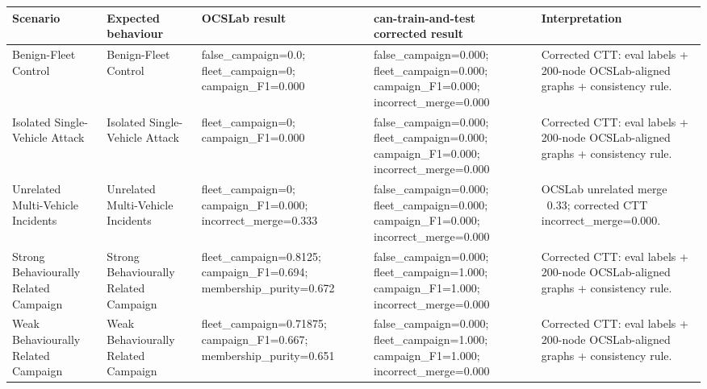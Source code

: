 \begin{tabular}{lllll}
\toprule
Scenario & Expected behaviour & OCSLab result & can-train-and-test corrected result & Interpretation \\
\midrule
Benign-Fleet Control & Benign-Fleet Control & false_campaign=0.0; fleet_campaign=0; campaign_F1=0.000 & false_campaign=0.000; fleet_campaign=0.000; campaign_F1=0.000; incorrect_merge=0.000 & Corrected CTT: eval labels + 200-node OCSLab-aligned graphs + consistency rule. \\
Isolated Single-Vehicle Attack & Isolated Single-Vehicle Attack & fleet_campaign=0; campaign_F1=0.000 & false_campaign=0.000; fleet_campaign=0.000; campaign_F1=0.000; incorrect_merge=0.000 & Corrected CTT: eval labels + 200-node OCSLab-aligned graphs + consistency rule. \\
Unrelated Multi-Vehicle Incidents & Unrelated Multi-Vehicle Incidents & fleet_campaign=0; campaign_F1=0.000; incorrect_merge=0.333 & false_campaign=0.000; fleet_campaign=0.000; campaign_F1=0.000; incorrect_merge=0.000 & OCSLab unrelated merge ~0.33; corrected CTT incorrect_merge=0.000. \\
Strong Behaviourally Related Campaign & Strong Behaviourally Related Campaign & fleet_campaign=0.8125; campaign_F1=0.694; membership_purity=0.672 & false_campaign=0.000; fleet_campaign=1.000; campaign_F1=1.000; incorrect_merge=0.000 & Corrected CTT: eval labels + 200-node OCSLab-aligned graphs + consistency rule. \\
Weak Behaviourally Related Campaign & Weak Behaviourally Related Campaign & fleet_campaign=0.71875; campaign_F1=0.667; membership_purity=0.651 & false_campaign=0.000; fleet_campaign=1.000; campaign_F1=1.000; incorrect_merge=0.000 & Corrected CTT: eval labels + 200-node OCSLab-aligned graphs + consistency rule. \\
\bottomrule
\end{tabular}
